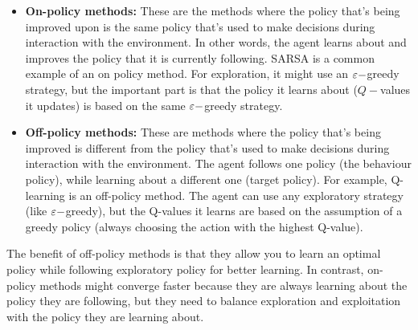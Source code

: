 \begin{itemize}
    \item \textbf{On-policy methods:} 
    These are the methods where the policy that's being improved upon is the same policy that's used to make decisions during interaction with the environment. In other words, the agent learns about and improves the policy that it is currently following. SARSA is a common example of an on policy method. For exploration, it might use an $\varepsilon-$greedy strategy, but the important part is that the policy it learns about ($Q-$values it updates) is based on the same $\varepsilon-$greedy strategy. 

    \item \textbf{Off-policy methods:} 
    These are methods where the policy that's being improved is different from the policy that's used to make decisions during interaction with the environment.
    The agent follows one policy (the behaviour policy), while learning about a different one (target policy). 
    For example, Q-learning is an off-policy method. The agent can use any exploratory strategy (like $\varepsilon-$greedy), but the Q-values it learns are based on the assumption of a greedy policy (always choosing the action with the highest Q-value). 
\end{itemize}
 The benefit of off-policy methods is that they allow you to learn an optimal policy while following exploratory policy for better learning. In contrast, on-policy methods might converge faster because they are always learning about the policy they are following, but they need to balance exploration and exploitation with the policy they are learning about. 



